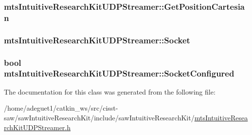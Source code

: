 \hypertarget{classmts_intuitive_research_kit_u_d_p_streamer_aeb53097fbe58b91a3e2ce02356ae673f}{
\subsubsection[{Get\-Position\-Cartesian}]{ mts\-Intuitive\-Research\-Kit\-U\-D\-P\-Streamer\-::\-Get\-Position\-Cartesian\hspace{0.3cm}{\ttfamily [protected]}}}\label{classmts_intuitive_research_kit_u_d_p_streamer_aeb53097fbe58b91a3e2ce02356ae673f}
\hypertarget{classmts_intuitive_research_kit_u_d_p_streamer_a0b479c1e42ce285852d0fef70f3e0597}{
\subsubsection[{Socket}]{ mts\-Intuitive\-Research\-Kit\-U\-D\-P\-Streamer\-::\-Socket\hspace{0.3cm}{\ttfamily [protected]}}}\label{classmts_intuitive_research_kit_u_d_p_streamer_a0b479c1e42ce285852d0fef70f3e0597}
\hypertarget{classmts_intuitive_research_kit_u_d_p_streamer_ac662f1d0ff67561e6f38d88d39f4e139}{
\subsubsection[{Socket\-Configured}]{\setlength{\rightskip}{0pt plus 5cm}bool mts\-Intuitive\-Research\-Kit\-U\-D\-P\-Streamer\-::\-Socket\-Configured\hspace{0.3cm}{\ttfamily [protected]}}}\label{classmts_intuitive_research_kit_u_d_p_streamer_ac662f1d0ff67561e6f38d88d39f4e139}


The documentation for this class was generated from the following file\-:\begin{DoxyCompactItemize}
\item 
/home/adeguet1/catkin\-\_\-ws/src/cisst-\/saw/saw\-Intuitive\-Research\-Kit/include/saw\-Intuitive\-Research\-Kit/\hyperlink{mts_intuitive_research_kit_u_d_p_streamer_8h}{mts\-Intuitive\-Research\-Kit\-U\-D\-P\-Streamer.\-h}\end{DoxyCompactItemize}
